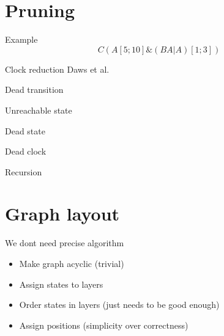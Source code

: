 \section{Pruning}
\begin{frame}{Example}
    $$C(A[5;10]\&(BA|A)[1;3])$$
    
\end{frame}
\begin{frame}{Clock reduction}
    Daws et al.
    
\end{frame}
\begin{frame}{Dead transition}
    
    
\end{frame}
\begin{frame}{Unreachable state}
    
    
\end{frame}
\begin{frame}{Dead state}
    
    
\end{frame}
\begin{frame}{Dead clock}
    
    
\end{frame}
\begin{frame}{Recursion}
    
    
\end{frame}

\begin{frame}
    
    
\end{frame}

\section{Graph layout}
\begin{frame}
    We dont need precise algorithm
    \begin{itemize}
        \item Make graph acyclic (trivial)
        \item Assign states to layers
        \item Order states in layers (just needs to be good enough)
        \item Assign positions (simplicity over correctness)
    \end{itemize}
\end{frame}

